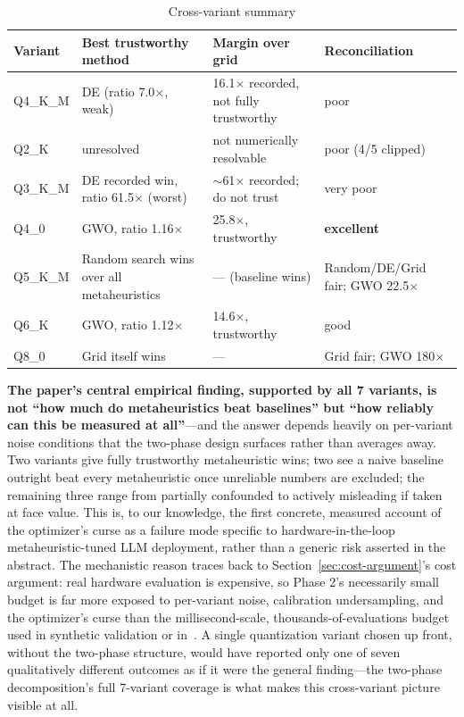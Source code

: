 \documentclass[conference, letterpaper]{IEEEtran}
\begin{document}
\begin{table}[t]
\caption{Cross-variant summary}
\label{tab:cross-variant-summary}
\centering
\footnotesize
\begin{tabular}{@{}lp{2.2cm}p{1.8cm}p{1.5cm}@{}}
\toprule
Variant & Best trustworthy method & Margin over grid & Reconciliation \\
\midrule
Q4\_K\_M & DE (ratio 7.0$\times$, weak) & 16.1$\times$ recorded, not fully trustworthy & poor \\
Q2\_K & unresolved & not numerically resolvable & poor (4/5 clipped) \\
Q3\_K\_M & DE recorded win, ratio 61.5$\times$ (worst) & $\sim$61$\times$ recorded; do not trust & very poor \\
Q4\_0 & GWO, ratio 1.16$\times$ & 25.8$\times$, trustworthy & \textbf{excellent} \\
Q5\_K\_M & Random search wins over all metaheuristics & --- (baseline wins) & Random/DE/Grid fair; GWO 22.5$\times$ \\
Q6\_K & GWO, ratio 1.12$\times$ & 14.6$\times$, trustworthy & good \\
Q8\_0 & Grid itself wins & --- & Grid fair; GWO 180$\times$ \\
\bottomrule
\end{tabular}
\end{table}

\textbf{The paper's central empirical finding, supported by all 7 variants, is not ``how much do metaheuristics beat baselines'' but ``how reliably can this be measured at all''}---and the answer depends heavily on per-variant noise conditions that the two-phase design surfaces rather than averages away. Two variants give fully trustworthy metaheuristic wins; two see a naive baseline outright beat every metaheuristic once unreliable numbers are excluded; the remaining three range from partially confounded to actively misleading if taken at face value. This is, to our knowledge, the first concrete, measured account of the optimizer's curse as a failure mode specific to hardware-in-the-loop metaheuristic-tuned LLM deployment, rather than a generic risk asserted in the abstract. The mechanistic reason traces back to Section~\ref{sec:cost-argument}'s cost argument: real hardware evaluation is expensive, so Phase 2's necessarily small budget is far more exposed to per-variant noise, calibration undersampling, and the optimizer's curse than the millisecond-scale, thousands-of-evaluations budget used in synthetic validation or in~\cite{ref11}. A single quantization variant chosen up front, without the two-phase structure, would have reported only one of seven qualitatively different outcomes as if it were the general finding---the two-phase decomposition's full 7-variant coverage is what makes this cross-variant picture visible at all.
\end{document}
